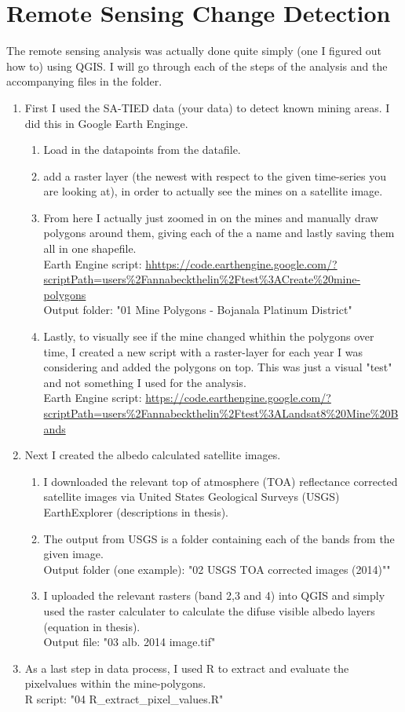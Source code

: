 \documentclass[12pt,a4paper]{article}
\theoremstyle{break}
\theoremstyle{nonumberplain}
\begin{document}
\section*{Remote Sensing Change Detection}
The remote sensing analysis was actually done quite simply (one I figured out how to) using QGIS. I will go through each of the steps of the analysis and the accompanying files in the folder.

\begin{enumerate}
\item First I used the SA-TIED data (your data) to detect known mining areas. I did this in Google Earth Enginge.
	\begin{enumerate}
	\item Load in the datapoints from the datafile. 
	\item add a raster layer (the newest with respect to the given time-series you are looking at), in order to actually see the mines on a satellite image.

	\item From here I actually just zoomed in on the mines and manually draw polygons around them, giving each of the a name and lastly saving them all in one shapefile.\\
	Earth Engine script: \url{hhttps://code.earthengine.google.com/?scriptPath=users%2Fannabeckthelin%2Ftest%3ACreate%20mine-polygons}\\
	Output folder: "01 Mine Polygons - Bojanala Platinum District"

	\item Lastly, to visually see if the mine changed whithin the polygons over time, I created a new script with a raster-layer for each year I was considering and added the polygons on top. This was just a visual "test" and not something I used for the analysis.\\
	Earth Engine script: \url{https://code.earthengine.google.com/?scriptPath=users%2Fannabeckthelin%2Ftest%3ALandsat8%20Mine%20Bands}
	\end{enumerate}
\item Next I created the albedo calculated satellite images.
	\begin{enumerate}
	\item I downloaded the relevant top of atmosphere (TOA) reflectance corrected satellite images via United States Geological Surveys (USGS) EarthExplorer (descriptions in thesis).
	\item The output from USGS is a folder containing each of the bands from the given image.\\
	Output folder (one example): "02 USGS TOA corrected images (2014)""
	\item I uploaded the relevant rasters (band 2,3 and 4) into QGIS and simply used the raster calculater to calculate the difuse visible albedo layers (equation in thesis).\\
	Output file: "03 alb. 2014 image.tif"
	\end{enumerate}
\item As a last step in data process, I used R to extract and evaluate the pixelvalues within the mine-polygons.\\
R script: "04 R_extract_pixel_values.R"
\end{enumerate}
\end{document}
